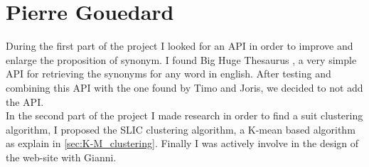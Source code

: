 \section{Pierre Gouedard}

During the first part of the project I looked for an API in order to improve and enlarge the proposition of synonym. I found Big Huge Thesaurus \cite{BGT}, a very simple API for retrieving the synonyms for any word in english. After testing and combining this API with the one found by Timo and Joris, we decided to not add the API.\\
In the second part of the project I made research in order to find a suit clustering algorithm, I proposed the SLIC clustering algorithm,  a K-mean based algorithm as explain in \ref{sec:K-M_clustering}. Finally I was actively involve in the design of the web-site with Gianni.  


